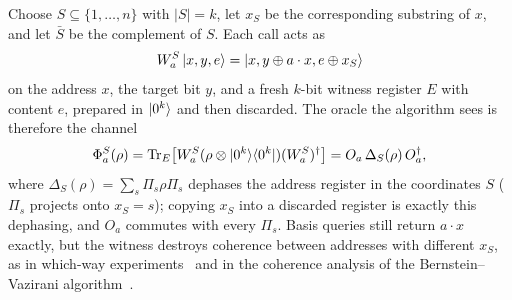 \documentclass[
  aps,
  pra,
  reprint,
  nofootinbib
]{revtex4-2}
\begin{document}
Choose \(S\subseteq\{1,\ldots,n\}\) with \(|S|=k\), let \(x_S\) be the
corresponding substring of \(x\), and let \(\bar S\) be the complement of
\(S\). Each call acts as
\begin{equation}
 W_a^S\ket{x,y,e}
 =\ket{x,y\oplus a\cdot x,e\oplus x_S}
 \label{eq:witness-unitary}
\end{equation}
on the address \(x\), the target bit \(y\), and a fresh \(k\)-bit witness
register \(E\) with content \(e\), prepared in \(\ket{0^k}\) and then
discarded. The
oracle the algorithm sees is therefore the channel
\begin{equation}
 \Phi_a^S(\rho)=\operatorname{Tr}_E\!\left[
 W_a^S(\rho\otimes\ket{0^k}\!\bra{0^k})(W_a^S)^\dagger
 \right]
 =O_a\,\Delta_S(\rho)\,O_a^\dagger ,
 \label{eq:witness-channel}
\end{equation}
where \(\Delta_S(\rho)=\sum_s\Pi_s\rho\Pi_s\) dephases the address register in
the coordinates \(S\) (\(\Pi_s\) projects onto \(x_S=s\)); copying \(x_S\)
into a discarded register is exactly this dephasing, and \(O_a\) commutes with
every \(\Pi_s\). Basis queries still return \(a\cdot x\) exactly, but the
witness destroys coherence between addresses with different \(x_S\), as in
which-way experiments~\cite{Englert1996} and in the coherence analysis of the
Bernstein--Vazirani algorithm~\cite{NaseriEtAl2022}.
\end{document}
